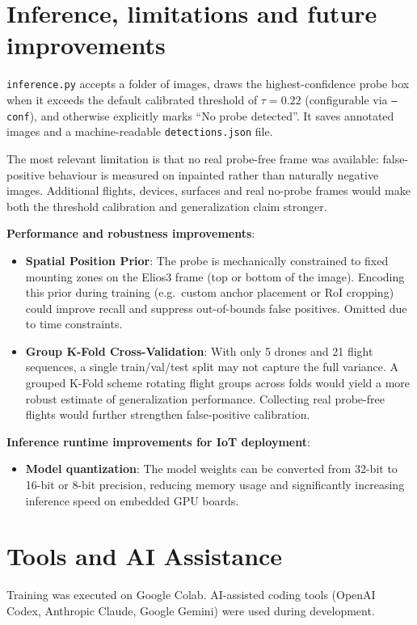 \documentclass[11pt,a4paper]{article}
\begin{document}
\section{Inference, limitations and future improvements}

\texttt{inference.py} accepts a folder of images, draws the highest-confidence probe box when it exceeds the default calibrated threshold of $\tau = 0.22$ (configurable via \texttt{--conf}), and otherwise explicitly marks ``No probe detected''. It saves annotated images and a machine-readable \texttt{detections.json} file.

The most relevant limitation is that no real probe-free frame was available: false-positive behaviour is measured on inpainted rather than naturally negative images. Additional flights, devices, surfaces and real no-probe frames would make both the threshold calibration and generalization claim stronger.

\textbf{Performance and robustness improvements}:
\begin{itemize}[nosep]
    \item \textbf{Spatial Position Prior}: The probe is mechanically constrained to fixed mounting zones on the Elios3 frame (top or bottom of the image). Encoding this prior during training (e.g.\ custom anchor placement or RoI cropping) could improve recall and suppress out-of-bounds false positives. Omitted due to time constraints.
    \item \textbf{Group K-Fold Cross-Validation}: With only 5 drones and 21 flight sequences, a single train/val/test split may not capture the full variance. A grouped K-Fold scheme rotating flight groups across folds would yield a more robust estimate of generalization performance. Collecting real probe-free flights would further strengthen false-positive calibration.
\end{itemize}

\textbf{Inference runtime improvements for IoT deployment}:
\begin{itemize}[nosep]
    \item \textbf{Model quantization}: The model weights can be converted from 32-bit to 16-bit or 8-bit precision, reducing memory usage and significantly increasing inference speed on embedded GPU boards.
\end{itemize}

\section*{Tools and AI Assistance}
Training was executed on Google Colab. AI-assisted coding tools (OpenAI Codex, Anthropic Claude, Google Gemini) were used during development.
\end{document}
